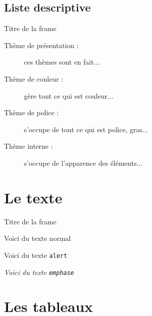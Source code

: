 \documentclass{bredelebeamer}
\begin{document}
		\subsection{Liste descriptive}
\begin{frame}{Titre de la frame}
	\begin{description}
		\item [Thème de présentation : ] ces thèmes sont en fait...
		\item [Thème de couleur : ] gère tout ce qui est couleur...
		\item [Thème de police : ] s'occupe de tout ce qui est police, gras...
		\item [Thème interne : ] s'occupe de l'apparence des éléments...
	\end{description}
\end{frame}



\section{Le texte}

\begin{frame}{Titre de la frame}

Voici du texte normal

\alert{Voici du texte \texttt{alert}}


\emph{Voici du texte \texttt{emphase}}

\end{frame}


\section{Les tableaux}
\end{document}
